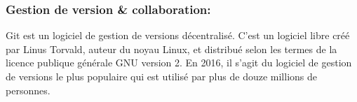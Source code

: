 \documentclass[a4paper]{report}
\begin{document}
\begin{spacing}{2}
\subsubsection{Gestion de version \& collaboration:}
\begin{minipage}{0.2\textwidth}
	\begin{minipage}{\linewidth}
	\end{minipage}
\end{minipage}
\hfill
\begin{minipage}{0.75\textwidth}
	Git est un logiciel de gestion de versions décentralisé. C'est un logiciel libre créé par Linus Torvald, auteur du noyau Linux, et distribué selon les termes de la licence publique générale GNU version 2. En 2016, il s’agit du logiciel de gestion de versions le plus populaire qui est utilisé par plus de douze millions de personnes.\\
\end{minipage}\\


\end{spacing}
\end{document}
